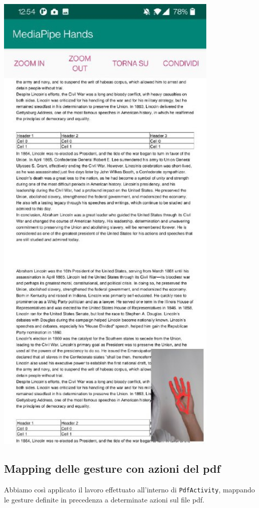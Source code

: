 \begin{multicols}{2}
\begin{multicolfigure}
            \includegraphics[width=0.8\textwidth]{images/pdfactivity.png}
        \end{multicolfigure}
    \end{multicols}


\newpage
\subsection{Mapping delle gesture con azioni del pdf}
Abbiamo così applicato il lavoro effettuato all'interno di \texttt{PdfActivity}, mappando le gesture definite in precedenza a determinate azioni sul file pdf.


